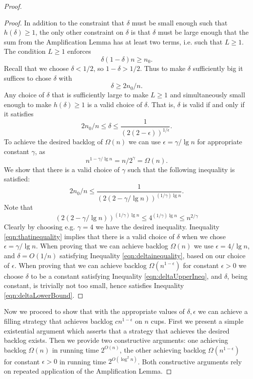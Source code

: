 \documentclass[twocolumn]{article}[10pt]
\begin{document}
\begin{proof}
\begin{proof}
  In addition to the constraint that $\delta$ must be small enough such that
  $h(\delta) \ge 1$, the only other constraint on $\delta$ is that $\delta$
  must be large enough that the sum from the Amplification Lemma has at least
  two terms, i.e. such that $L \ge 1$.
  The condition $L \ge 1$ enforces 
  $$\delta(1-\delta)n \ge n_0. $$
  Recall that we choose $\delta < 1/2$, so $1-\delta > 1/2$. Thus to make
  $\delta$ sufficiently big it suffices to chose $\delta$ with 
  \begin{equation}
    \label{eqn:deltaLowerBound}
    \delta \ge 2n_0/n.
  \end{equation}
  Any choice of $\delta$ that is sufficiently large to make $L \ge 1$ and
  simultaneously small enough to make $h(\delta) \ge 1$ is a valid choice of
  $\delta$. That is, $\delta$ is valid if and only if it satisfies
  \begin{equation}
    \label{eqn:deltainequality}
       2n_0/n \le \delta \le  \frac{1}{(2(2-\epsilon))^{1/\epsilon}}.
  \end{equation}
  To achieve the desired backlog of $\Omega(n)$ we can use $\epsilon =
  \gamma/\lg n$ for appropriate constant $\gamma$, as $$n^{1-\gamma/\lg n} =
  n/2^\gamma = \Omega(n).$$
  We show that there is a valid choice of $\gamma$ such that the following inequality is satisfied:
  \begin{equation}
    \label{eqn:thatinequality}
   2n_0/n \le \frac{1}{(2(2-\gamma/\lg n))^{(1/\gamma)\lg n}}.
  \end{equation}
  Note that 
  $$(2(2-\gamma/\lg n))^{(1/\gamma)\lg n} \le 4^{(1/\gamma)\lg n} \le n^{2/\gamma}$$
  Clearly by choosing e.g. $\gamma = 4$ we have the desired inequality.
  Inequality \ref{eqn:thatinequality} implies that there is a valid choice of
  $\delta$ when we chose $\epsilon = \gamma / \lg n$. When proving that we can
  achieve backlog $\Omega(n)$ we use $\epsilon = 4 / \lg n$, and $\delta =
  O(1/n)$ satisfying Inequality \ref{eqn:deltainequality}, based on our choice
  of $\epsilon$. When proving that we can achieve backlog
  $\Omega(n^{1-\epsilon})$ for constant $\epsilon > 0$ we choose $\delta$ to be
  a constant satisfying Inequality \ref{eqn:deltaUpperIneq}, and $\delta$, being constant, is
  trivially not too small, hence satisfies Inequality \ref{eqn:deltaLowerBound}.
    
  \end{proof}

  Now we proceed to show that with the appropriate values of $\delta, \epsilon$ we
  can achieve a filling strategy that achieves backlog $cn^{1-\epsilon}$ on $n$ cups.
  First we present a simple existential argument which asserts that a strategy
  that achieves the desired backlog exists. Then we provide two constructive
  arguments: one achieving backlog $\Omega(n)$ in running time $2^{O(n)}$,
  the other achieving backlog $\Omega(n^{1-\epsilon})$ for constant $\epsilon>
  0$ in running time $2^{O(\log^2 n)}$. Both constructive arguments rely on
  repeated application of the Amplification Lemma.
  

\end{proof}
\end{document}
